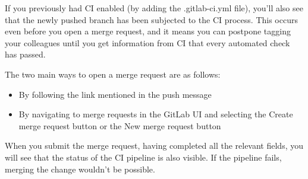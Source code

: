 If you previously had CI enabled (by adding the .gitlab-ci.yml file), you'll also see that the newly pushed branch has been subjected to the CI process. This occurs even before you open a merge request, and it means you can postpone tagging your colleagues until you get information from CI that every automated check has passed.

The two main ways to open a merge request are as follows:

\begin{itemize}
\item 
By following the link mentioned in the push message

\item 
By navigating to merge requests in the GitLab UI and selecting the Create merge request button or the New merge request button
\end{itemize}

When you submit the merge request, having completed all the relevant fields, you will see that the status of the CI pipeline is also visible. If the pipeline fails, merging the change wouldn't be possible.

























